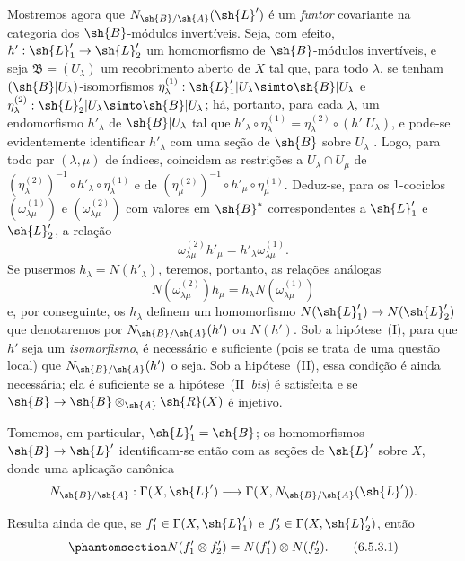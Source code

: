 \documentclass[oneside,10pt]{amsart}
\makeatletter
\newcommand{\ega@arrow}[2]{\mathchoice{#1}{#2}{#2}{#2}}
\renewcommand{\to}{\ega@arrow{\longrightarrow}{\rightarrow}}
\newcommand{\oldpage}[2][]{\marginnote{\normalfont\footnotesize\textbf{#1}~|~#2}\ignorespaces}
\let\EGAOriginalLabel\label
\renewcommand{\label}[1]{\phantomsection\EGAOriginalLabel{#1}}
\makeatother
\begin{document}
\begin{env}[6.5.3]
\label{II.6.5.3}
Mostremos agora que $N_{\sh{B}/\sh{A}}(\sh{L}')$ é um \emph{funtor} covariante na categoria dos $\sh{B}$-módulos invertíveis.
Seja, com efeito, $h':\sh{L}'_1\to\sh{L}'_2$ um homomorfismo de $\sh{B}$-módulos invertíveis, e seja $\mathfrak{B}=(U_\lambda)$ um recobrimento aberto de $X$ tal que, para todo $\lambda$, se tenham $(\sh{B}|U_\lambda)$-isomorfismos $\eta_\lambda^{(1)}:\sh{L}'_1|U_\lambda\simto\sh{B}|U_\lambda$ e $\eta_\lambda^{(2)}:\sh{L}'_2|U_\lambda\simto\sh{B}|U_\lambda$;
há, portanto, para cada $\lambda$, um endomorfismo $h'_\lambda$ de $\sh{B}|U_\lambda$ tal que $h'_\lambda\circ\eta_\lambda^{(1)}=\eta_\lambda^{(2)}\circ(h'|U_\lambda)$, e pode-se evidentemente identificar $h'_\lambda$ com uma seção de $\sh{B}$ sobre $U_\lambda$ .
Logo, para todo par $(\lambda,\mu)$ de índices, coincidem as restrições a $U_\lambda\cap U_\mu$ de $(\eta_\lambda^{(2)})^{-1}\circ h'_\lambda\circ\eta_\lambda^{(1)}$ e de $(\eta_\mu^{(2)})^{-1}\circ h'_\mu\circ\eta_\mu^{(1)}$.
Deduz-se, para os $1$-cociclos $(\omega_{\lambda\mu}^{(1)})$ e $(\omega_{\lambda\mu}^{(2)})$ com valores em $\sh{B}^*$ correspondentes a $\sh{L}'_1$ e $\sh{L}'_2$, a relação
\[
  \omega_{\lambda\mu}^{(2)}h'_\mu = h'_\lambda\omega_{\lambda\mu}^{(1)}.
\]
\oldpage[II]{128}
Se pusermos $h_\lambda=N(h'_\lambda)$, teremos, portanto, as relações análogas
\[
  N(\omega_{\lambda\mu}^{(2)})h_\mu = h_\lambda N(\omega_{\lambda\mu}^{(1)})
\]
e, por conseguinte, os $h_\lambda$ definem um homomorfismo $N(\sh{L}'_1)\to N(\sh{L}'_2)$ que denotaremos por $N_{\sh{B}/\sh{A}}(h')$ ou $N(h')$.
Sob a hipótese~(I), para que $h'$ seja um \emph{isomorfismo}, é necessário e suficiente (pois se trata de uma questão local) que $N_{\sh{B}/\sh{A}}(h')$ o seja.
Sob a hipótese~(II), essa condição é ainda necessária;
ela é suficiente se a hipótese~(II~\emph{bis}) é satisfeita e se $\sh{B}\to\sh{B}\otimes_{\sh{A}}\sh{R}(X)$ é injetivo.

Tomemos, em particular, $\sh{L}'_1=\sh{B}$;
os homomorfismos $\sh{B}\to\sh{L}'$ identificam-se então  com as seções de $\sh{L}'$ sobre $X$, donde uma aplicação canônica
\[
  N_{\sh{B}/\sh{A}} : \Gamma(X,\sh{L}')\to\Gamma(X,N_{\sh{B}/\sh{A}}(\sh{L}')).
\]

Resulta ainda de  que, se $f'_1\in\Gamma(X,\sh{L}'_1)$ e $f'_2\in\Gamma(X,\sh{L}'_2)$, então
\[
\label{II.6.5.3.1}
  N(f'_1\otimes f'_2) = N(f'_1)\otimes N(f'_2).
\tag{6.5.3.1}
\]


\end{env}
\end{document}

